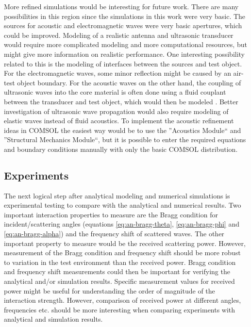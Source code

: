 \documentclass[11pt,twoside]{eitExjobb}
\begin{document}
	More refined simulations would be interesting for future work. There are many possibilities in this region since the simulations in this work were very basic. The sources for acoustic and electromagnetic waves were very basic apertures, which could be improved. Modeling of a realistic antenna and ultrasonic transducer would require more complicated modeling and more computational resources, but might give more information on realistic performance. One interesting possibility related to this is the modeling of interfaces between the sources and test object. For the electromagnetic waves, some minor reflection might be caused by an air-test object boundary. For the acoustic waves on the other hand, the coupling of ultrasonic waves into the core material is often done using a fluid couplant between the transducer and test object, which would then be modeled \cite{Schmerr2016}. Better investigation of ultrasonic wave propagation would also require modeling of elastic waves instead of fluid acoustics. To implement the acoustic refinement ideas in COMSOL the easiest way would be to use the ''Acoustics Module`` and ''Structural Mechanics Module``, but it is possible to enter the required equations and boundary conditions manually with only the basic COMSOL distribution.
	
	\subsection{Experiments}
	The next logical step after analytical modeling and numerical simulations is experimental testing to compare with the analytical and numerical results. Two important interaction properties to measure are the Bragg condition for incident/scattering angles (equations \eqref{eq:an-bragg-theta}, \eqref{eq:an-bragg-phi} and \eqref{eq:an-bragg-alpha}) and the frequency shift of scattered waves. The other important property to measure would be the received scattering power. However, measurement of the Bragg condition and frequency shift should be more robust to variation in the test environment than the received power. Bragg condition and frequency shift measurements  could then be important for verifying the analytical and/or simulation results. Specific measurement values for received power might be useful for understanding the order of magnitude of the interaction strength. However, comparison of received power at different angles, frequencies etc. should be more interesting when comparing experiments with analytical and simulation results.
	
\end{document}
